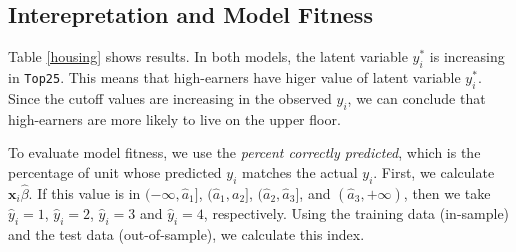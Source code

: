 \documentclass[
  12pt,
]{article}
\begin{document}
\hypertarget{interepretation-and-model-fitness}{%
\subsection{Interepretation and Model
Fitness}\label{interepretation-and-model-fitness}}

Table \ref{housing} shows results. In both models, the latent variable
\(y_i^*\) is increasing in \texttt{Top25}. This means that high-earners
have higer value of latent variable \(y_i^*\). Since the cutoff values
are increasing in the observed \(y_i\), we can conclude that
high-earners are more likely to live on the upper floor.

To evaluate model fitness, we use the \emph{percent correctly
predicted}, which is the percentage of unit whose predicted \(y_i\)
matches the actual \(y_i\). First, we calculate
\(\mathbf{x}_i \hat{\beta}\). If this value is in
\((-\infty, \hat{a}_1]\), \((\hat{a}_1, a_2]\),
\((\hat{a}_2, \hat{a}_3]\), and \((\hat{a}_3, +\infty)\), then we take
\(\hat{y}_i = 1\), \(\hat{y}_i = 2\), \(\hat{y}_i = 3\) and
\(\hat{y}_i = 4\), respectively. Using the training data (in-sample) and
the test data (out-of-sample), we calculate this index.
\end{document}
